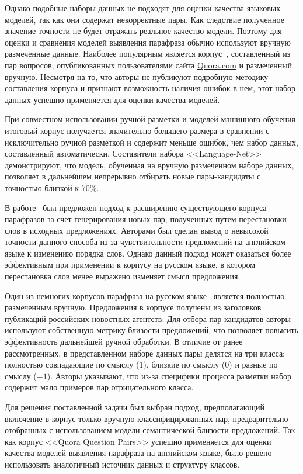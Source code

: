 \documentclass[a4paper,14pt]{extarticle}
\begin{document}
Однако подобные наборы данных не подходят для оценки качества языковых моделей, так как они содержат некорректные пары. Как следствие полученное значение точности не будет отражать реальное качество модели.
Поэтому для оценки и сравнения моделей выявления парафраза обычно используют вручную размеченные данные.
Наиболее популярным является корпус~\autocite{iyer_csernai_dandekar_2017}, составленный из пар вопросов, опубликованных пользователями сайта \href{https://www.quora.com/}{Quora.com} и размеченный вручную.
Несмотря на то, что авторы не публикуют подробную методику составления корпуса и признают возможность наличия ошибок в нем, этот набор данных успешно применяется для оценки качества моделей.

При совместном использовании ручной разметки и моделей машинного обучения итоговый корпус получается значительно большего размера в сравнении с исключительно ручной разметкой и содержит меньше ошибок, чем набор данных, составленный автоматически.
Составители набора {<<Language-Net>>}~\autocite{lan-etal-2017-continuously} демонстрируют, что модель, обученная на вручную размеченном наборе данных, позволяет в дальнейшем непрерывно отбирать новые пары-кандидаты с точностью близкой к $70\%$.

В работе~\autocite{zhang2019paws} был предложен подход к расширению существующего корпуса парафразов за счет генерирования новых пар, полученных путем перестановки слов в исходных предложениях. Авторами был сделан вывод о невысокой точности данного способа из-за чувствительности предложений на английском языке к изменению порядка слов. Однако данный подход может оказаться более эффективным при применении к корпусу на русском языке, в котором перестановка слов менее выражено изменяет смысл предложения.

Один из немногих корпусов парафраза на русском языке~\autocite{pivovarova2017paraphraser} является полностью размеченным вручную. Предложения в корпусе получены из заголовков публикаций российских новостных агентств.
Для отбора пар-кандидатов авторы используют собственную метрику близости предложений, что позволяет повысить эффективность дальнейшей ручной обработки. В отличие от ранее рассмотренных, в представленном наборе данных пары делятся на три класса: полностью совпадающие по смыслу ($1$), близкие по смыслу ($0$) и разные по смыслу ($-1$).
Авторы указывают, что из-за специфики процесса разметки набор содержит мало примеров пар отрицательного класса.

Для решения поставленной задачи был выбран подход, предполагающий включение в корпус только вручную классифицированных пар, предварительно отобранных с использованием модели семантической близости предложений.
Так как корпус {<<Quora Question Pairs>>} успешно применяется для оценки качества моделей выявления парафраза на английском языке, было решено использовать аналогичный источник данных и структуру классов.
\end{document}
